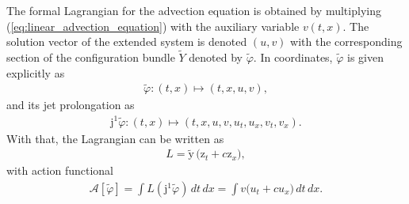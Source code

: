 \documentclass[12pt,a4paper,reqno]{article}
\begin{document}
The formal Lagrangian for the advection equation is obtained by multiplying (\ref{eq:linear_advection_equation}) with the auxiliary variable ${\ensuremath{{\ensuremath{{v}}}}} ({\ensuremath{{\ensuremath{{t}}}}}, {\ensuremath{{\ensuremath{{x}}}}})$.
The solution vector of the extended system is denoted $({\ensuremath{{\ensuremath{{u}}}}},{\ensuremath{{\ensuremath{{v}}}}})$ with the corresponding section of the configuration bundle $\tilde{Y}$ denoted by $\tilde{\ensuremath{\varphi}}$. In coordinates, $\tilde{\ensuremath{\varphi}}$ is given explicitly as
\begin{align}
\tilde{\ensuremath{\varphi}} : ( {\ensuremath{{\ensuremath{{t}}}}}, {\ensuremath{{\ensuremath{{x}}}}} ) \mapsto ( {\ensuremath{{\ensuremath{{t}}}}} , {\ensuremath{{\ensuremath{{x}}}}} , {\ensuremath{{\ensuremath{{u}}}}}, {\ensuremath{{\ensuremath{{v}}}}} ) ,
\end{align}
and its jet prolongation as
\begin{align}
{\ensuremath{\mathrm{j}}}^{1} \tilde{\ensuremath{\varphi}} : ( {\ensuremath{{\ensuremath{{t}}}}}, {\ensuremath{{\ensuremath{{x}}}}} ) \mapsto ( {\ensuremath{{\ensuremath{{t}}}}} , {\ensuremath{{\ensuremath{{x}}}}} , {\ensuremath{{\ensuremath{{u}}}}}, {\ensuremath{{\ensuremath{{v}}}}}, {\ensuremath{{\ensuremath{{u}}}}}_{\ensuremath{{\ensuremath{{t}}}}}, {\ensuremath{{\ensuremath{{u}}}}}_{\ensuremath{{\ensuremath{{x}}}}}, {\ensuremath{{\ensuremath{{v}}}}}_{\ensuremath{{\ensuremath{{t}}}}}, {\ensuremath{{\ensuremath{{v}}}}}_{\ensuremath{{\ensuremath{{x}}}}} ) .
\end{align}
With that, the Lagrangian can be written as
\begin{align}\label{eq:linear_advection_lagrangian}
L = \tilde{\ensuremath{{\ensuremath{\mathrm{{y}}}}}} \, \big( {\ensuremath{{\ensuremath{\mathrm{{z}}}}}}_{\ensuremath{{\ensuremath{{t}}}}} + c {\ensuremath{{\ensuremath{\mathrm{{z}}}}}}_{\ensuremath{{\ensuremath{{x}}}}} \big) ,
\end{align}
with action functional
\begin{align}\label{eq:linear_advection_action}
\mathcal{A} [\tilde{\ensuremath{\varphi}}] = \int L ( {\ensuremath{\mathrm{j}}}^{1} \tilde{\ensuremath{\varphi}}) \, d{\ensuremath{{\ensuremath{{t}}}}} \, d{\ensuremath{{\ensuremath{{x}}}}} = \int {\ensuremath{{\ensuremath{{v}}}}} \big( {\ensuremath{{\ensuremath{{u}}}}}_{\ensuremath{{\ensuremath{{t}}}}} + c {\ensuremath{{\ensuremath{{u}}}}}_{\ensuremath{{\ensuremath{{x}}}}} \big) \, d{\ensuremath{{\ensuremath{{t}}}}} \, d{\ensuremath{{\ensuremath{{x}}}}} .
\end{align}
\end{document}

